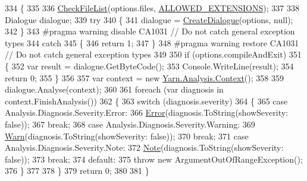 \begin{DoxyCode}
334         \{
335 
336             \hyperlink{a00174_ad77564b25725a771f0fd4da430582e6f}{CheckFileList}(options.files, \hyperlink{a00174_a0979de7ea02c8c0375b8220a12e6575e}{ALLOWED\_EXTENSIONS});
337 
338             Dialogue dialogue;
339             \textcolor{keywordflow}{try}
340             \{
341                 dialogue = \hyperlink{a00174_aab244361a510cee18ad2f636d110e0d5}{CreateDialogue}(options, null);
342             \}
343 \textcolor{preprocessor}{#pragma warning disable CA1031 // Do not catch general exception types}
344 \textcolor{preprocessor}{}            \textcolor{keywordflow}{catch}
345             \{
346                 \textcolor{keywordflow}{return} 1;
347             \}
348 \textcolor{preprocessor}{#pragma warning restore CA1031 // Do not catch general exception types}
349 \textcolor{preprocessor}{}
350             \textcolor{keywordflow}{if} (options.compileAndExit)
351             \{
352                 var result = dialogue.GetByteCode();
353                 Console.WriteLine(result);
354                 \textcolor{keywordflow}{return} 0;
355             \}
356 
357             var context = \textcolor{keyword}{new} \hyperlink{a00056}{Yarn.Analysis.Context}();
358 
359             dialogue.Analyse(context);
360 
361             \textcolor{keywordflow}{foreach} (var diagnosis \textcolor{keywordflow}{in} context.FinishAnalysis())
362             \{
363                 \textcolor{keywordflow}{switch} (diagnosis.severity)
364                 \{
365                     \textcolor{keywordflow}{case} Analysis.Diagnosis.Severity.Error:
366                         \hyperlink{a00174_a2f63f9f5b7634cb50ee75ff2eb18b137}{Error}(diagnosis.ToString(showSeverity: \textcolor{keyword}{false}));
367                         \textcolor{keywordflow}{break};
368                     \textcolor{keywordflow}{case} Analysis.Diagnosis.Severity.Warning:
369                         \hyperlink{a00174_a979bb6f049b6c5294f745a19e24ddd9d}{Warn}(diagnosis.ToString(showSeverity: \textcolor{keyword}{false}));
370                         \textcolor{keywordflow}{break};
371                     \textcolor{keywordflow}{case} Analysis.Diagnosis.Severity.Note:
372                         \hyperlink{a00174_a939cc9e943c574b36c6af93e9c772702}{Note}(diagnosis.ToString(showSeverity: \textcolor{keyword}{false}));
373                         \textcolor{keywordflow}{break};
374                     \textcolor{keywordflow}{default}:
375                         \textcolor{keywordflow}{throw} \textcolor{keyword}{new} ArgumentOutOfRangeException();
376                 \}
377 
378             \}
379             \textcolor{keywordflow}{return} 0;
380 
381         \}
\end{DoxyCode}



